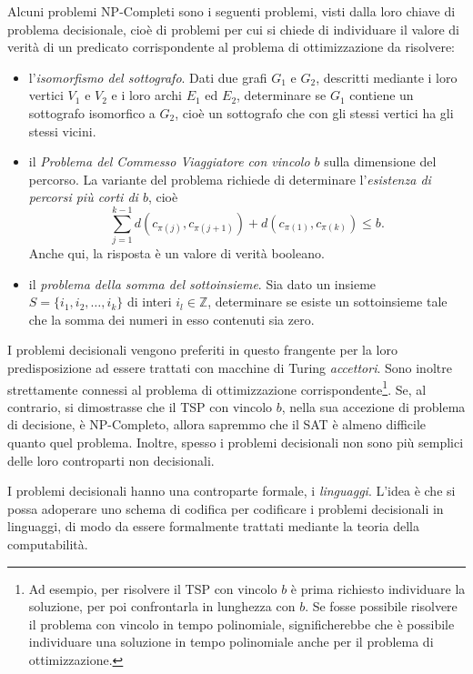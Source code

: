 \documentclass[10pt]{\classname}
\theoremstyle{newlinethm}
\theoremstyle{theorem}
\theoremstyle{definition}
\theoremstyle{definition}
\theoremstyle{definition}
\theoremstyle{definition}
\begin{document}
Alcuni problemi NP-Completi sono i seguenti problemi, visti dalla loro chiave di problema decisionale, cioè di problemi per cui si chiede di individuare il valore di verità di un predicato corrispondente al problema di ottimizzazione da risolvere:
\begin{itemize}
    \item l'\emph{isomorfismo del sottografo}. Dati due grafi $G_1$ e $G_2$, descritti mediante i loro vertici $V_1$ e $V_2$ e i loro archi $E_1$ ed $E_2$, determinare se $G_1$ contiene un sottografo isomorfico a $G_2$, cioè un sottografo che con gli stessi vertici ha gli stessi vicini.
    \item il \emph{Problema del Commesso Viaggiatore con vincolo $b$} sulla dimensione del percorso. La variante del problema richiede di determinare l'\emph{esistenza di percorsi più corti di $b$}, cioè \[\sum_{j=1}^{k-1} d(c_{\pi(j)}, c_{\pi(j+1)}) + d(c_{\pi(1)},c_{\pi(k)}) \leq b.\] Anche qui, la risposta è un valore di verità booleano.
    \item il \emph{problema della somma del sottoinsieme}. Sia dato un insieme $S=\{i_1, i_2, \dots, i_k\}$ di interi $i_l \in \mathbb{Z}$, determinare se esiste un sottoinsieme tale che la somma dei numeri in esso contenuti sia zero.
\end{itemize}
I problemi decisionali vengono preferiti in questo frangente per la loro predisposizione ad essere trattati con macchine di Turing \emph{accettori}. Sono inoltre strettamente connessi al problema di ottimizzazione corrispondente\footnote{Ad esempio, per risolvere il TSP con vincolo $b$ è prima richiesto individuare la soluzione, per poi confrontarla in lunghezza con $b$. Se fosse possibile risolvere il problema con vincolo in tempo polinomiale, significherebbe che è possibile individuare una soluzione in tempo polinomiale anche per il problema di ottimizzazione.}. Se, al contrario, si dimostrasse che il TSP con vincolo $b$, nella sua accezione di problema di decisione, è NP-Completo, allora sapremmo che il SAT è almeno difficile quanto quel problema. Inoltre, spesso i problemi decisionali non sono più semplici delle loro controparti non decisionali.

I problemi decisionali hanno una controparte formale, i \emph{linguaggi}. L'idea è che si possa adoperare uno schema di codifica per codificare i problemi decisionali in linguaggi, di modo da essere formalmente trattati mediante la teoria della computabilità.
\end{document}
